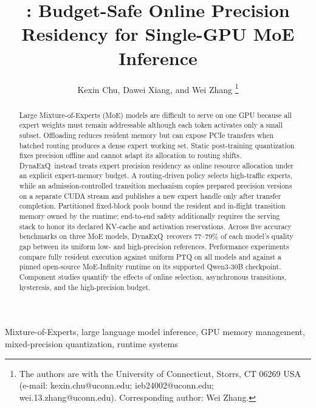 \documentclass[journal]{IEEEtran}
\title{\systemname: Budget-Safe Online Precision Residency for Single-GPU MoE Inference}
\author{Kexin Chu, Dawei Xiang, and Wei Zhang%
\thanks{The authors are with the University of Connecticut, Storrs, CT 06269
USA (e-mail: kexin.chu@uconn.edu; ieb24002@uconn.edu;
wei.13.zhang@uconn.edu). Corresponding author: Wei Zhang.}}
\newcommand{\systemname}{DynaExQ}
\begin{document}
\maketitle

\begin{abstract}
Large Mixture-of-Experts (MoE) models are difficult to serve on one GPU because all expert weights must remain addressable although each token activates only a small subset. Offloading reduces resident memory but can expose PCIe transfers when batched routing produces a dense expert working set. Static post-training quantization fixes precision offline and cannot adapt its allocation to routing shifts. \systemname\ instead treats expert precision residency as online resource allocation under an explicit expert-memory budget. A routing-driven policy selects high-traffic experts, while an admission-controlled transition mechanism copies prepared precision versions on a separate CUDA stream and publishes a new expert handle only after transfer completion. Partitioned fixed-block pools bound the resident and in-flight transition memory owned by the runtime; end-to-end safety additionally requires the serving stack to honor its declared KV-cache and activation reservations. Across five accuracy benchmarks on three MoE models, \systemname\ recovers 77--79\% of each model's quality gap between its uniform low- and high-precision references. Performance experiments compare fully resident execution against uniform PTQ on all models and against a pinned open-source MoE-Infinity runtime on its supported Qwen3-30B checkpoint. Component studies quantify the effects of online selection, asynchronous transitions, hysteresis, and the high-precision budget.
\end{abstract}

\begin{IEEEkeywords}
Mixture-of-Experts, large language model inference, GPU memory management, mixed-precision quantization, runtime systems
\end{IEEEkeywords}












\end{document}
